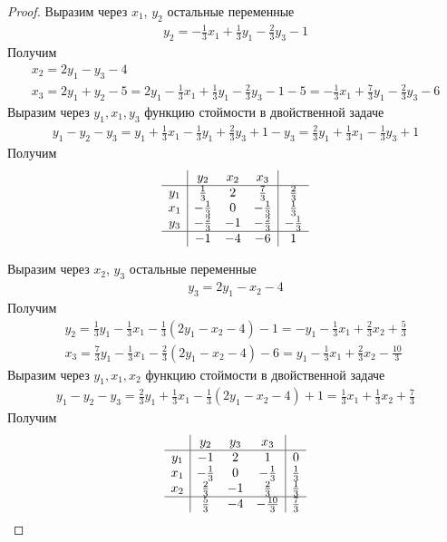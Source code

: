 \begin{proof}
	Выразим через $x_{1}$, $y_{2}$ остальные переменные
	\begin{gather*}
		y_{2} = -\frac{1}{3} x_{1} + \frac{1}{3} y_{1} - \frac{2}{3}y_{3} - 1
	\end{gather*}
	Получим
	\begin{gather*}
		x_{2}
		= 2y_{1} - y_{3} - 4\\
		x_{3}
		= 2y_{1} + y_{2} - 5
		= 2y_{1} -\frac{1}{3} x_{1} + \frac{1}{3} y_{1} - \frac{2}{3}y_{3} - 1 - 5
		= -\frac{1}{3} x_{1} + \frac{7}{3} y_{1} - \frac{2}{3} y_{3} - 6
	\end{gather*}
	Выразим через $y_{1}, x_{1}, y_{3}$ функцию стоймости в двойственной задаче
	\begin{gather*}
		y_{1} - y_{2} - y_{3}
		= y_{1} + \frac{1}{3} x_{1} - \frac{1}{3} y_{1} + \frac{2}{3}y_{3} + 1 - y_{3}
		= \frac{2}{3} y_{1} + \frac{1}{3} x_{1} - \frac{1}{3} y_{3} + 1
	\end{gather*}
	Получим
	\begin{gather*}
	\begin{array}{c|ccc|c} 
		& y_{2} & x_{2} & x_{3} & \\
		\hline 
		y_{1} & \frac{1}{3} & 2 & \frac{7}{3} & \frac{2}{3}\\
		x_{1} & -\frac{1}{3} & 0 & -\frac{1}{3} & \frac{1}{3}\\
		y_{3} & -\frac{2}{3} & -1 & -\frac{2}{3} & -\frac{1}{3}\\
		\hline 
		& -1 & -4 & -6 & 1
	\end{array}
	\end{gather*}

	Выразим через $x_{2}$, $y_{3}$ остальные переменные
	\begin{gather*}
		y_{3} = 2y_{1} - x_{2} - 4
	\end{gather*}
	Получим
	\begin{gather*}
		y_{2}
		= \frac{1}{3} y_{1} - \frac{1}{3} x_{1} - \frac{1}{3} (2 y_{1} - x_{2} - 4) - 1
		= -y_{1} - \frac{1}{3} x_{1} + \frac{2}{3} x_{2} + \frac{5}{3}\\
		x_{3}
		= \frac{7}{3} y_{1} - \frac{1}{3} x_{1} - \frac{2}{3} (2 y_{1} - x_{2} - 4) - 6
		= y_{1} - \frac{1}{3} x_{1} + \frac{2}{3} x_{2} - \frac{10}{3}
	\end{gather*}
	Выразим через $y_{1}, x_{1}, x_{2}$ функцию стоймости в двойственной задаче
	\begin{gather*}
		y_{1} - y_{2} - y_{3}
		= \frac{2}{3} y_{1} + \frac{1}{3} x_{1} - \frac{1}{3} (2y_{1} - x_{2} - 4) + 1
		= \frac{1}{3} x_{1} + \frac{1}{3} x_{2} + \frac{7}{3}
	\end{gather*}
	Получим
	\begin{gather*}
	\begin{array}{c|ccc|c} 
		& y_{2} & y_{3} & x_{3} & \\
		\hline 
		y_{1} & -1 & 2 & 1 & 0\\
		x_{1} & -\frac{1}{3} & 0 & -\frac{1}{3} & \frac{1}{3}\\
		x_{2} & \frac{2}{3} & -1 & \frac{2}{3} & \frac{1}{3}\\
		\hline 
		& \frac{5}{3} & -4 & -\frac{10}{3} & \frac{7}{3}
	\end{array}
	\end{gather*}


\end{proof}
